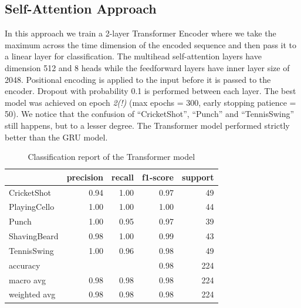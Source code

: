 \documentclass{article}
\begin{document}
\subsection{Self-Attention Approach}
In this approach we train a 2-layer Transformer Encoder where we take the maximum across the time dimension of the encoded sequence and then pass it to a linear layer for classification. The multihead self-attention layers have dimension 512 and 8 heads while the feedforward layers have inner layer size of 2048. Positional encoding is applied to the input before it is passed to the encoder. Dropout with probability 0.1 is performed between each layer. The best model was achieved on epoch \emph{2(!)} (max epochs = 300, early stopping patience = 50).  We notice that the confusion of “CricketShot”, “Punch” and “TennisSwing” still happens, but to a lesser degree. The Transformer model performed strictly better than the GRU model.

\begin{table}[h]
    \label{clfrep:transformer}
    \centering
    \begin{tabular}{lrrrr}
        \toprule
        & precision & recall & f1-score & support \\
        \midrule
        CricketShot & 0.94 & 1.00 & 0.97 & 49 \\
        PlayingCello & 1.00 & 1.00 & 1.00 & 44 \\
        Punch & 1.00 & 0.95 & 0.97 & 39 \\
        ShavingBeard & 0.98 & 1.00 & 0.99 & 43 \\
        TennisSwing & 1.00 & 0.96 & 0.98 & 49 \\
        \midrule
        accuracy &  &  & 0.98 & 224 \\
        macro avg & 0.98 & 0.98 & 0.98 & 224 \\
        weighted avg & 0.98 & 0.98 & 0.98 & 224 \\
        \bottomrule
    \end{tabular}
    \caption{Classification report of the Transformer model}
\end{table}
\end{document}
